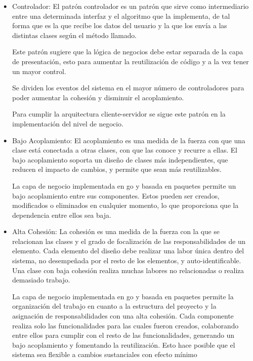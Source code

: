 \begin{itemize}
    \item Controlador: El patrón controlador es un patrón que sirve como intermediario entre una determinada interfaz y el algoritmo que la implementa, de tal forma que es la que recibe los datos del usuario y la que los envía a las distintas clases según el método llamado.

	Este patrón sugiere que la lógica de negocios debe estar separada de la capa de presentación, esto para aumentar la reutilización de código y a la vez tener un mayor control.

	Se dividen los eventos del sistema en el mayor número de controladores para poder aumentar la cohesión y disminuir el acoplamiento.
	
	Para cumplir la arquitectura cliente-servidor se sigue este patrón en la implementación del nivel de negocio.
	
	\item Bajo Acoplamiento: El acoplamiento es una medida de la fuerza con que una clase está conectada a otras clases, con que las conoce y recurre a ellas. El bajo acoplamiento soporta un diseño de clases más independientes, que reducen el impacto de cambios, y permite que sean más reutilizables.
	
	La capa de negocio implementada en go y basada en paquetes permite un bajo acoplamiento entre sus componentes. Estos pueden ser creados, modificados o eliminados en cualquier momento, lo que proporciona que la dependencia entre ellos sea baja.
	
	\item Alta Cohesión: La cohesión es una medida de la fuerza con la que se relacionan las clases y el grado de focalización de las responsabilidades de un elemento. Cada elemento del diseño debe realizar una labor única dentro del sistema, no desempeñada por el resto de los elementos, y auto-identificable. Una clase con baja cohesión realiza muchas labores no relacionadas o realiza demasiado trabajo.
	
	La capa de negocio implementada en go y basada en paquetes permite la organización del trabajo en cuanto a la estructura del proyecto y la asignación de responsabilidades con una alta cohesión. Cada componente realiza solo las funcionalidades para las cuales fueron creados, colaborando entre ellos para cumplir con el resto de las funcionalidades, generando un bajo acoplamiento y fomentando la reutilización. Esto hace posible que el sistema sea flexible a cambios sustanciales con efecto mínimo
\end{itemize}

